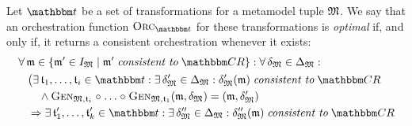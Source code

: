 \begin{definition}
    Let $\transformationset{T}$ be a set of transformations for a metamodel tuple $\metamodeltuple{M}%
    $.
    We say that an orchestration function $\orcfunction{\transformationset{T}}$ for these transformations is \emph{optimal} if, and only if, it returns a consistent orchestration whenever it exists:
    \begin{align*}
        &
        \forall \modeltuple{m} \in \setted{\modeltuple{m}' \in \metamodeltupleinstanceset{M} \mid \modeltuple{m}' \consistenttomath \consistencyrelationset{CR}} : \forall \changetuple{\metamodeltuple{M}} %
        \in \changeuniverse{\metamodeltuple{M}} : \\
        & \formulaskip
            \bigl(
            \exists \transformation{t}_{1}, \dots, \transformation{t}_{i} \in \transformationset{T} : 
            \exists \changetuple{\metamodeltuple{M}}' %
            \in \changeuniverse{\metamodeltuple{M}} : \changetuple{\metamodeltuple{M}}'(\modeltuple{m})
            \consistenttomath \consistencyrelationset{CR}\\
            & \formulaskip \formulaskip
            \land \generalizationfunction{\metamodeltuple{M}, \transformation{t}_{i}} \concatfunction \dots \concatfunction \generalizationfunction{\metamodeltuple{M}, \transformation{t}_{1}}(\modeltuple{m}, \changetuple{\metamodeltuple{M}}) = (\modeltuple{m}, \changetuple{\metamodeltuple{M}}')
            \\
            & \formulaskip
            \Rightarrow
            \exists \transformation{t}_{1}', \dots, \transformation{t}_{k}' \in \transformationset{T} : 
            \exists \changetuple{\metamodeltuple{M}}'' %
            \in \changeuniverse{\metamodeltuple{M}} : \changetuple{\metamodeltuple{M}}''(\modeltuple{m}) \consistenttomath \consistencyrelationset{CR}\\

\end{align*}
\end{definition}
